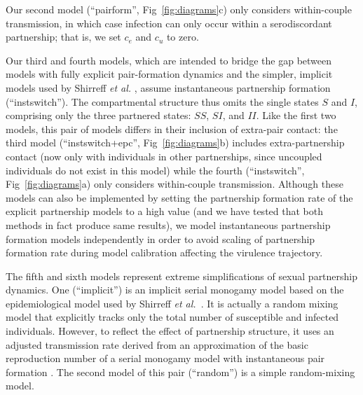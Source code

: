 \documentclass[10pt,letterpaper]{article}
\renewcommand{\figurename}{Fig}
\newcommand{\etal}{\textit{et al.}}
\newcommand{\diagfig}[1]{\figurename~\ref{fig:diagrams}#1}
\begin{document}
Our second model (``pairform'', \diagfig{c}) only considers within-couple transmission, in which case infection can only occur within a serodiscordant partnership; that is, we set $c_e$ and $c_u$ to zero.

Our third and fourth models, which are intended to bridge the gap between models with fully explicit pair-formation dynamics and the simpler, implicit models used by Shirreff \emph{et al.} \cite{shirreff_transmission_2011}, assume instantaneous partnership formation (``instswitch''). The compartmental structure thus omits the single states $S$ and $I$, comprising only the three partnered states: $SS$, $SI$, and $II$. Like the first two models, this pair of models differs in their inclusion of extra-pair contact: the third model (``instswitch+epc'', \diagfig{b}) includes extra-partnership contact (now only with individuals in other partnerships, since uncoupled individuals do not exist in this model) while the fourth (``instswitch'', \diagfig{a}) only considers within-couple transmission. Although these models can also be implemented
by setting the partnership formation rate of the explicit partnership models to a high value (and we have tested that both methods in fact produce same results), we model instantaneous partnership formation models independently in order to avoid scaling of partnership formation rate during model calibration affecting the virulence trajectory.

The fifth and sixth models represent extreme simplifications of sexual partnership dynamics.  One (``implicit'') is an implicit serial monogamy model based on the epidemiological model used by Shirreff \etal\ \cite{shirreff_transmission_2011}. It is actually a random mixing model that explicitly tracks only the total number of susceptible and infected individuals. However, to reflect the effect of partnership structure, it uses an adjusted transmission rate derived from an approximation of the basic reproduction number of a serial monogamy model with instantaneous pair formation \cite{hollingsworth_hiv1_2008}. The second model of this pair (``random'') is a simple random-mixing model.
\end{document}
